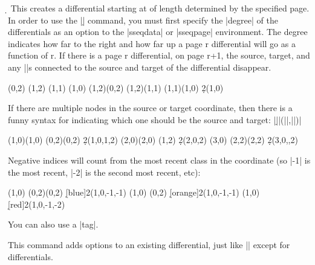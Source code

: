 \documentclass{ltxdoc}
\begin{document}
\begin{sseqdata}[name=ex1,degree={#1}{1-#1}]
\begin{command}{\d{}}
This creates a differential starting at  of length determined by the specified page. In order to use the |\d| command, you must first specify the |degree| of the differentials as an option to the |sseqdata| or |sseqpage| environment. The degree indicates how far to the right and how far up a page r differential will go as a function of r. If there is a page r differential, on page r+1, the source, target, and any |\structline|s connected to the source and target of the differential disappear.
\begin{codeexample}[width=7.5cm]
\begin{sseqdata}[name=d example,degree={-1}{#1},
                 struct lines=blue]
\class(0,2)
\class(1,2)
\class(1,1)
\class(1,0)
\structline(1,2)(0,2)
\structline(1,2)(1,1)
\structline(1,1)(1,0)
\d2(1,0)
\end{sseqdata}
\printpage[name=d example,page=2]
\hskip0.3cm
\printpage[name=d example,page=3]
\end{codeexample}
If there are multiple nodes in the source or target coordinate, then there is a funny syntax for indicating which one should be the source and target:
|\d||(||,||)|
\begin{codeexample}[width=6cm]
\begin{sseqpage}
\class(1,0)\class(1,0)
\class(0,2)\class(0,2)
\d2(1,0,1,2)
\class(2,0)\class(2,0)
\class(1,2)
\d2(2,0,2)
\class(3,0)
\class(2,2)\class(2,2)
\d2(3,0,,2)
\end{sseqpage}
\end{codeexample}
Negative indices will count from the most recent class in the coordinate (so |-1| is the most recent, |-2| is the second most recent, etc):
\begin{codeexample}[]
\begin{sseqpage}
\class(1,0)
\class(0,2)\class(0,2)
\d[blue]2(1,0,-1,-1)
\class(1,0)
\class(0,2)
\d[orange]2(1,0,-1,-1)
\class(1,0)
\d[red]2(1,0,-1,-2)
\end{sseqpage}
\end{codeexample}
You can also use a |tag|.
\end{command}

\begin{command}{}
This command adds options to an existing differential, just like |\classoptions| except for differentials.
\end{command}


\end{sseqdata}
\end{document}
